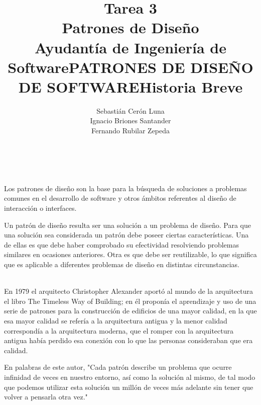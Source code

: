 \documentclass[a4paper,10pt]{report}
\begin{document}
\title{\textbf{Tarea 3\\Patrones de Diseño\\}Ayudantía de Ingeniería de Software}
\author{Sebastián Cerón Luna\\
        Ignacio Briones Santander \\
        Fernando Rubilar Zepeda}
\maketitle


\title {\textbf{PATRONES DE DISEÑO DE SOFTWARE}}\\\\


Los patrones de diseño son la base para la búsqueda de soluciones a problemas comunes en el desarrollo de software y otros ámbitos referentes al diseño de interacción o interfaces.

Un patrón de diseño resulta ser una solución a un problema de diseño. Para que una solución sea considerada un patrón debe poseer ciertas características. Una de ellas es que debe haber comprobado su efectividad resolviendo problemas similares en ocasiones anteriores. Otra es que debe ser reutilizable, lo que significa que es aplicable a diferentes problemas de diseño en distintas circunstancias.\\

\title{\textbf{Historia Breve}}\\

En 1979 el arquitecto Christopher Alexander aportó al mundo de la arquitectura el libro The Timeless Way of Building; en él proponía el aprendizaje y uso de una serie de patrones para la construcción de edificios de una mayor calidad, en la que esa mayor calidad se refería a la arquitectura antigua y la menor calidad correspondía a la arquitectura moderna, que el romper con la arquitectura antigua había perdido esa conexión con lo que las personas consideraban que era calidad.

En palabras de este autor, "Cada patrón describe un problema que ocurre infinidad de veces en nuestro entorno, así como la solución al mismo, de tal modo que podemos utilizar esta solución un millón de veces más adelante sin tener que volver a pensarla otra vez."
\end{document}
